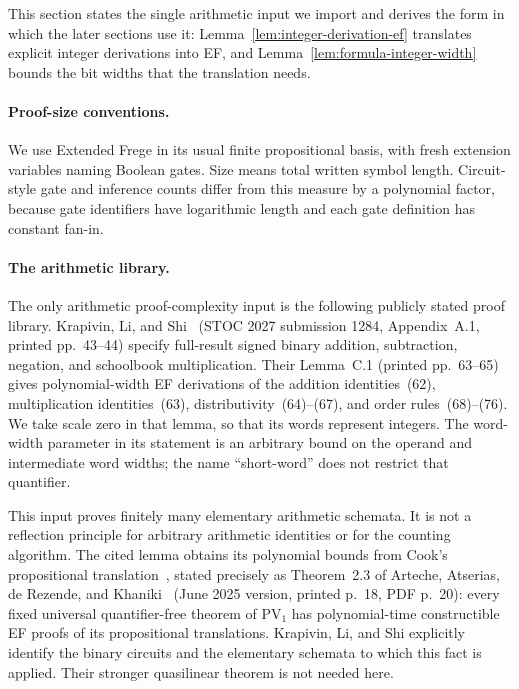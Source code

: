 \documentclass[11pt]{article}
\theoremstyle{definition}
\theoremstyle{remark}
\begin{document}
This section states the single arithmetic input we import and derives
the form in which the later sections use it:
Lemma~\ref{lem:integer-derivation-ef} translates explicit integer
derivations into EF, and Lemma~\ref{lem:formula-integer-width} bounds
the bit widths that the translation needs.

\paragraph{Proof-size conventions.}
We use Extended Frege in its usual finite propositional basis, with
fresh extension variables naming Boolean gates. Size means total written
symbol length. Circuit-style gate and inference counts differ from this
measure by a polynomial factor, because gate identifiers have
logarithmic length and each gate definition has constant fan-in.

\paragraph{The arithmetic library.}
The only arithmetic proof-complexity input is the following publicly
stated proof library. Krapivin, Li, and Shi~\cite{kls} (STOC 2027
submission 1284, Appendix~A.1, printed pp.~43--44) specify full-result
signed binary addition, subtraction, negation, and schoolbook
multiplication. Their Lemma~C.1 (printed pp.~63--65) gives
polynomial-width EF derivations of the addition identities~(62),
multiplication identities~(63), distributivity~(64)--(67), and order
rules~(68)--(76). We take scale zero in that lemma, so that its words
represent integers. The word-width parameter in its statement is an
arbitrary bound on the operand and intermediate word widths; the name
``short-word'' does not restrict that quantifier.

This input proves finitely many elementary arithmetic schemata. It is
not a reflection principle for arbitrary arithmetic identities or for
the counting algorithm. The cited lemma obtains its polynomial bounds
from Cook's propositional translation~\cite{cook75}, stated precisely as Theorem~2.3
of Arteche, Atserias, de Rezende, and Khaniki~\cite{aadk} (June
2025 version, printed p.~18, PDF p.~20): every fixed universal
quantifier-free theorem of $\mathrm{PV}_1$ has polynomial-time
constructible EF proofs of its propositional translations. Krapivin,
Li, and Shi explicitly identify the binary circuits and the elementary
schemata to which this fact is applied. Their stronger quasilinear
theorem is not needed here.
\end{document}

